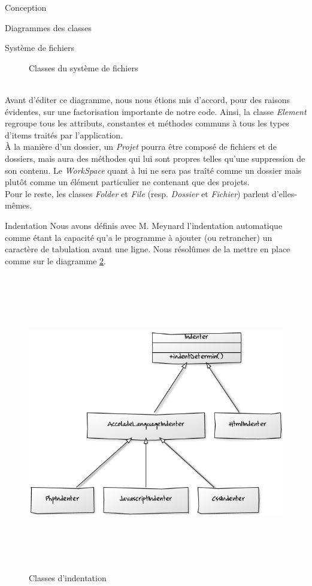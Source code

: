 \documentclass[a4paper, 12pt]{report}
\begin{document}
\begin{part}{Conception}
\begin{chapter}{Diagrammes des classes}
\begin{section}{Système de fichiers}
\begin{figure}[ht]
\begin{center}
						\caption{Classes du système de fichiers}
						\label{arbo}
					\end{center}
				\end{figure}~\\
				Avant d'éditer ce diagramme, nous nous étions mis d'accord, pour des raisons évidentes, sur une factorisation importante de 
				notre code. Ainsi, la classe \emph{Element} regroupe tous les attributs, constantes et méthodes communs à tous les types d'items 
				traités par l'application.\\
				À la manière d'un dossier, un \emph{Projet} pourra être composé de fichiers et de dossiers,
				mais aura des méthodes qui lui sont propres	telles qu'une suppression de son contenu.
				Le \emph{WorkSpace} quant à lui ne sera pas traîté comme un dossier mais plutôt comme un élément particulier ne contenant
				que des projets.\\
				Pour le reste, les classes \emph{Folder} et \emph{File} (resp. \emph{Dossier} et \emph{Fichier}) parlent d'elles-mêmes.
			\end{section}
			\begin{section}{Indentation}
				Nous avons définis avec M. Meynard l'indentation automatique comme étant la capacité qu'a le programme à ajouter (ou retrancher)
				un caractère de tabulation avant une ligne. Nous résolûmes de la mettre en place comme sur le diagramme \ref{guitare}.
				\begin{figure}[ht]
					\begin{center}
						\includegraphics[height=13cm]{images/classesIndentation.png}
						\caption{Classes d'indentation}
						\label{guitare}
					\end{center}
				\end{figure}~\\


\end{section}
\end{chapter}
\end{part}
\end{document}
